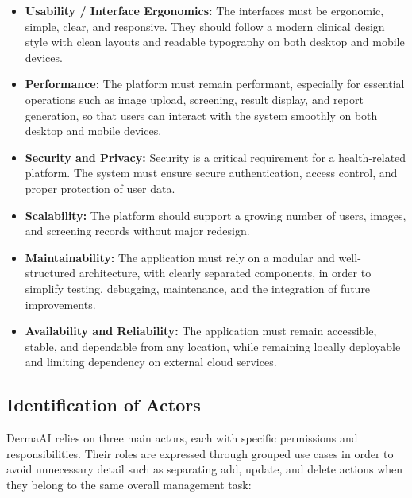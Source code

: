 	\begin{itemize}
	  \item[\textit{o}] \textbf{Usability / Interface Ergonomics:} The interfaces must be ergonomic,
	        simple, clear, and responsive. They should follow a modern clinical design style
	        with clean layouts and readable typography on both desktop and mobile devices.
	
	  \item[\textit{o}] \textbf{Performance:} The platform must remain performant, especially for
	        essential operations such as image upload, screening, result display, and report
	        generation, so that users can interact with the system smoothly on both desktop
	        and mobile devices.
	
	  \item[\textit{o}] \textbf{Security and Privacy:} Security is a critical requirement for a
	        health-related platform. The system must ensure secure authentication, access
	        control, and proper protection of user data.
	
	  \item[\textit{o}] \textbf{Scalability:} The platform should support a growing number of users,
	        images, and screening records without major redesign.
	
	  \item[\textit{o}] \textbf{Maintainability:} The application must rely on a modular and
	        well-structured architecture, with clearly separated components, in order to
	        simplify testing, debugging, maintenance, and the integration of future
	        improvements.
	
	  \item[\textit{o}] \textbf{Availability and Reliability:} The application must remain
	        accessible, stable, and dependable from any location, while remaining locally
	        deployable and limiting dependency on external cloud services.
	\end{itemize}
	
	\subsection{Identification of Actors}
	
	DermaAI relies on three main actors, each with specific permissions and responsibilities.
	Their roles are expressed through grouped use cases in order to avoid unnecessary detail
	such as separating add, update, and delete actions when they belong to the same overall
	management task:
	
